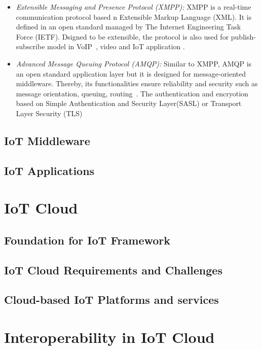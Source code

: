 \begin{description}
\begin{itemize}
    \item \textit{Extensible Messaging and Presence Protocol (XMPP): } XMPP  is a real-time communication protocol based n Extensible Markup Language (XML). It is defined in an open standard managed by The Internet Engineering Task Force (IETF). Dsigned to be extensible, the protocol is also used for publish-subscribe model in VoIP~, video and IoT application . 
    
    \item \textit{Advanced Message Queuing Protocol (AMQP): } Similar to XMPP, AMQP is an open standard application layer but it is designed for message-oriented middleware. Thereby, its functionalities ensure reliability and security such as message orientation, queuing, routing~\cite{o2007toward}. The authentication and encryotion based on Simple Authentication and Security Layer(SASL) or Transport Layer Security (TLS)
    
    \end{itemize}
    
\end{description}

\subsection{IoT Middleware}
\subsection{IoT Applications}
\section{IoT Cloud}
\subsection{Foundation for IoT Framework}
\subsection{IoT Cloud Requirements and Challenges}
\subsection{Cloud-based IoT Platforms and services}
\section{Interoperability in IoT Cloud}
